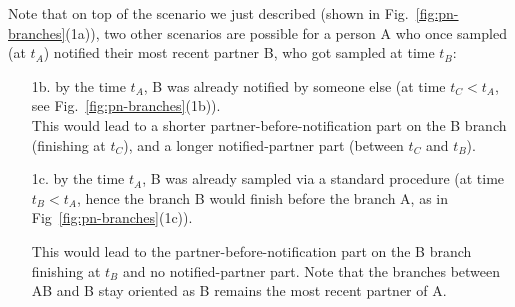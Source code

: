 \documentclass[10pt,letterpaper]{article}
\begin{document}
%



Note that on top of the scenario we just described (shown in Fig.~\ref{fig:pn-branches}(1a)), two other scenarios are possible for a person A who once sampled (at $t_A$) notified their most recent partner B, who got sampled at time $t_B$:
\begin{enumerate}

\item[1b.] by the time $t_A$, B was already notified by someone else (at time $t_C < t_A$, see Fig.~\ref{fig:pn-branches}(1b)).
\\

This would lead to a shorter partner-before-notification part on the B branch (finishing at $t_C$), and a longer notified-partner part (between $t_C$ and $t_B$). 
 

\item[1c.] by the time $t_A$, B was already sampled via a standard procedure (at time $t_B < t_A$, hence the branch B would finish before the branch A, as in Fig~\ref{fig:pn-branches}(1c)).

This would lead to the partner-before-notification part on the B branch finishing at $t_B$ and no notified-partner part. Note that the branches between AB and B stay oriented as B remains the most recent partner of A.
\end{enumerate}
\end{document}
